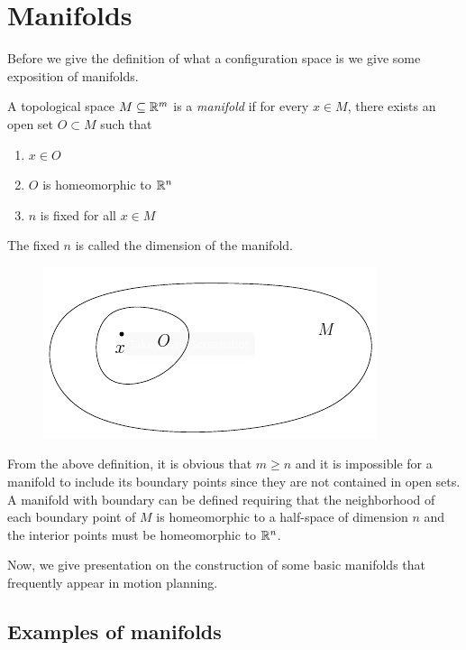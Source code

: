 \section{Manifolds}
Before we give the definition of what a configuration space is we give some exposition of manifolds.
\begin{defn}
    A topological space $M \subseteq \mathbb{R}^m$ is a \textit{manifold} if for every $x \in M$, there exists an open set $O \subset M$ such that 
    \begin{enumerate}
        \item $x \in O$
        \item $O$ is homeomorphic to $\mathbb{R}^n$
        \item $n$ is fixed for all $x \in M$
    \end{enumerate}
    The fixed $n$ is called the dimension of the manifold.
    \begin{figure}[H]
        \centering
        \includegraphics[scale=.95]{images/manifold}
    \end{figure}
\end{defn}

From the above definition, it is obvious that $m \ge n$ and it is impossible for a manifold to include its boundary points since they are not contained in open sets.
\linebreak
A manifold with boundary can be defined requiring that the neighborhood of each boundary point of $M$ is homeomorphic to a half-space of dimension $n$ and the interior points must be homeomorphic to $\mathbb{R}^n$.

Now, we give presentation on the construction of some basic manifolds that frequently appear in motion planning.

\subsection{Examples of manifolds}


